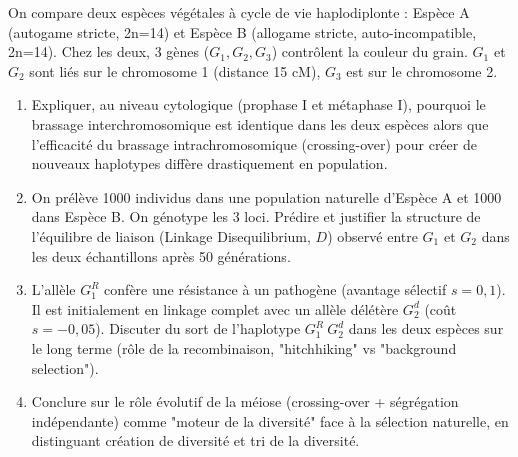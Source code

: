 \documentclass[11pt]{article}
\begin{document}
\begin{exercice}
On compare deux espèces végétales à cycle de vie haplodiplonte : Espèce A (autogame stricte, 2n=14) et Espèce B (allogame stricte, auto-incompatible, 2n=14). Chez les deux, 3 gènes ($G_1, G_2, G_3$) contrôlent la couleur du grain. $G_1$ et $G_2$ sont liés sur le chromosome 1 (distance 15 cM), $G_3$ est sur le chromosome 2.
\begin{enumerate}
\item Expliquer, au niveau cytologique (prophase I et métaphase I), pourquoi le brassage interchromosomique est identique dans les deux espèces alors que l'efficacité du brassage intrachromosomique (crossing-over) pour créer de nouveaux haplotypes diffère drastiquement en population.
\item On prélève 1000 individus dans une population naturelle d'Espèce A et 1000 dans Espèce B. On génotype les 3 loci. Prédire et justifier la structure de l'équilibre de liaison (Linkage Disequilibrium, $D$) observé entre $G_1$ et $G_2$ dans les deux échantillons après 50 générations.
\item L'allèle $G_1^R$ confère une résistance à un pathogène (avantage sélectif $s=0,1$). Il est initialement en linkage complet avec un allèle délétère $G_2^d$ (coût $s=-0,05$). Discuter du sort de l'haplotype $G_1^R\ G_2^d$ dans les deux espèces sur le long terme (rôle de la recombinaison, "hitchhiking" vs "background selection").
\item Conclure sur le rôle évolutif de la méiose (crossing-over + ségrégation indépendante) comme "moteur de la diversité" face à la sélection naturelle, en distinguant création de diversité et tri de la diversité.
\end{enumerate}
\end{exercice}
\end{document}
